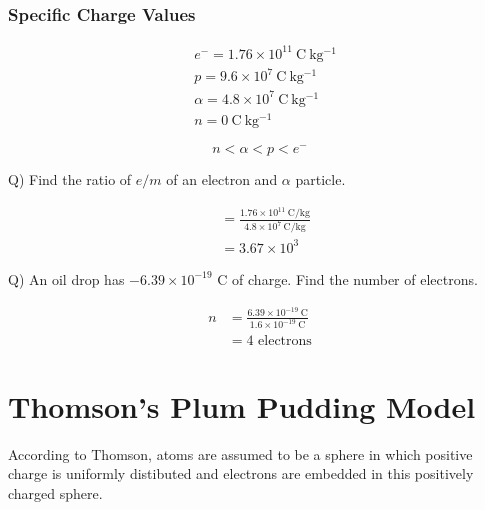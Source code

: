 \documentclass[12pt,a4paper]{article}
\newcommand{\answer}{\tcblower}
\begin{document}
\subsubsection*{Specific Charge Values}

\begin{align*}
   & e^- =1.76\times 10^{11} \mathrm{\ C\ kg^{-1}}   \\
   & p = 9.6\times 10^{7} \mathrm{\ C\ kg^{-1}}      \\
   & \alpha = 4.8\times 10^{7} \mathrm{\ C\ kg^{-1}} \\
   & n = 0 \mathrm{\ C\ kg^{-1}}
\end{align*}

$$\boxed{n<\alpha<p<e^-}$$

\begin{question}

  Q) Find the ratio of $e/m$ of an electron and $\alpha$ particle.

  \answer

  \begin{align*}
     & = \frac{1.76\times 10^{11} \mathrm{\ C/kg}}{4.8\times 10^{7} \mathrm{\ C/kg}} \\
     & = 3.67 \times 10^3
  \end{align*}

\end{question}

\begin{question}

  Q) An oil drop has $-6.39\times 10^{-19}$ C of charge. Find the number of electrons.

  \answer

  \begin{align*}
    n & = \frac{6.39\times 10^{-19} \mathrm{\ C}}{1.6\times 10^{-19} \mathrm{\ C}} \\
      & = 4 \text{ electrons}
  \end{align*}

\end{question}

\section*{Thomson's Plum Pudding Model}


According to Thomson, atoms are assumed to be a sphere in which positive charge is uniformly distibuted and electrons are embedded in this positively charged sphere.
\end{document}
